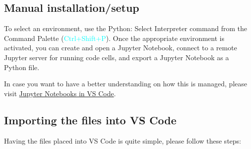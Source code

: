 \documentclass{assignment}
\begin{document}
\subsection{Manual installation/setup}

To select an environment, use the Python: Select Interpreter command from the Command Palette (\textcolor{cyan}{Ctrl+Shift+P}). Once the appropriate environment is activated, you can create and open a Jupyter Notebook, connect to a remote Jupyter server for running code cells, and export a Jupyter Notebook as a Python file.

In case you want to have a better understanding on how this is managed, please visit \href{https://code.visualstudio.com/docs/datascience/jupyter-notebooks}{Jupyter Notebooks in VS Code}.

\subsection{Importing the files into VS Code}

Having the files placed into VS Code is quite simple, please follow these steps:
\end{document}
